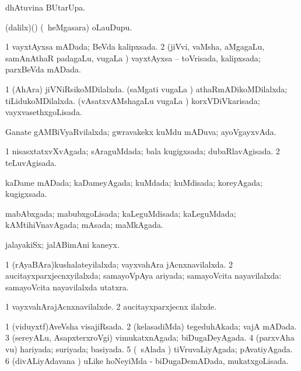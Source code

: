 \bentry
{} 
\gl{\kirx}
\bmng
  dhAtuvina BUtarUpa. 
\emng
\eentry

\bentry
{} 
\gl{\nA}
\expl{}
\bmng
 (\bava dalilx)(\AmA) (\kanmu\ heMgasara) oLauDupu. 
\emng
\eentry

\bentry
{} 
\gl{\gu}
\expl{}
\bmng
\bnum
\num{1} vayxtAyxsa mADada; BeVda kalipxsada. 
\num{2} (jiVvi, vaMsha, aMgagaLu, samAnAthaR padagaLu, \mo vugaLa \vi) vayxtAyxsa -- toVrisada, kalipxsada; parxBeVda mADada. 
\enum
\emng
\eentry

\bentry
{} 
\gl{\gu}
\expl{}
\bmng
\bnum
\num{1} (AhAra) jiVNiRsikoMDilalxda. 
\banum
{} (saMgati \mo vugaLa \vi) athaRmADikoMDilalxda; tiLidukoMDilalxda. 
 (vAsatxvAMshagaLu \mo vugaLa \vi) korxVDiVkarisada; vayxvasethxgoLisada. 
\eanum
\numie
\enum
\emng
\eentry

\bentry
{} 
\gl{\gu}
\expl{}
\bmng
 Ganate gAMBiVyaRvilalxda; gwravakekx kuMdu mADuva; ayoVgayxvAda. 
\emng
\eentry

\bentry
{} 
\gl{\gu} 
\bmng
\bnum
\num{1} nisasxtatxvXvAgada; sAraguMdada; bala kugigxsada; dubaRlavAgisada. 
\num{2} teLuvAgisada. 
\enum
\emng
\eentry

\bentry
{} 
\gl{\gu}
\expl{}
\bmng
 kaDame mADada; kaDameyAgada; kuMdada; kuMdisada; koreyAgada; kugigxsada. 
\emng
\eentry

\bentry
{} 
\gl{\gu}
\expl{}
\bmng
 mabAbxgada; mabubxgoLisada; kaLeguMdisada; kaLeguMdada; kAMtihiVnavAgada; mAsada; maMkAgada. 
\emng
\eentry

\bentry
{} 
\gl{\nA}
\expl{}
\bmng
 jalayakiSx; jalABimAni kaneyx. 
\emng
\eentry

\bentry
{} 
\gl{\gu}
\expl{}
\bmng
\bnum
\num{1} (rAyaBAra)kushalateyilalxda; vayxvahAra jAcnxnavilalxda. 
\num{2} aucitayxparxjecnxyilalxda; samayoVpAya ariyada; samayoVcita nayavilalxda:  samayoVcita nayavilalxda utatxra. 
\enum
\emng
\eentry

\bentry
{} 
\gl{\kirxvi}
\expl{}
\bmng
\bnum
\num{1} vayxvahArajAcnxnavilalxde. 
\num{2} aucitayxparxjecnx ilalxde. 
\enum
\emng
\eentry

\bentry
{} 
\gl{\gu}
\expl{}
\bmng
\bnum
\num{1} (viduyxtf)AveVsha visajiRsada. 
\num{2} (kelasadiMda) tegeduhAkada; vajA mADada. 
\num{3} (sereyALu, AsapxterxroVgi) vimukatxnAgada; biDugaDeyAgada. 
\num{4} (parxvAha \mo vu) hariyada; suriyada; basiyada. 
\num{5} (\kanmu\ sAlada \vi) tiVruvaLiyAgada; pAvatiyAgada. 
\num{6} (divALiyAdavana \vi) uLike hoNeyiMda - biDugaDemADada, mukatxgoLisada. 
\enum
\emng
\eentry

